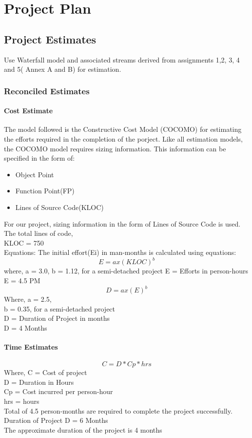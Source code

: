 \documentclass[oneside,a4paper,12pt]{report}
\begin{document}
\chapter{Project Plan}

\section{Project Estimates}
                 Use Waterfall model and associated streams derived from assignments 1,2, 3, 4 and 5( Annex A and B) for estimation.
\subsection{Reconciled Estimates}
\subsubsection{Cost Estimate}
\hspace*{0.25 in}
The model followed is the Constructive Cost Model (COCOMO) for estimating the
efforts required in the completion of the porject. Like all estimation models, the
COCOMO model requires sizing information. This information can be specified in
the form of:
\begin{itemize}
  \item Object Point
  \item Function Point(FP)
  \item Lines of Source Code(KLOC)
\end{itemize}
For our project, sizing information in the form of Lines of Source Code is used. The
total lines of code,\\
KLOC = 750\\
Equations: The initial effort(Ei) in man-months is calculated using equations:\\

\[E=ax(KLOC)^b\]
\hspace*{0.25 in}where, a = 3.0, b = 1.12, for a semi-detached project
E = Efforts in person-hours\\
E = 4.5 PM\\
\[D=ax(E)^b\]
Where, a = 2.5,\\
b = 0.35, for a semi-detached project\\
D = Duration of Project in months\\
D = 4 Months\\

\subsubsection{Time Estimates}
\[C=D*Cp*hrs\]
Where, C = Cost of project\\
D = Duration in Hours\\
Cp = Cost incurred per person-hour\\
hrs = hours\\
Total of 4.5 person-months are required to complete the project successfully.\\
Duration of Project D = 6 Months\\
The approximate duration of the project is 4 months\\
\end{document}
